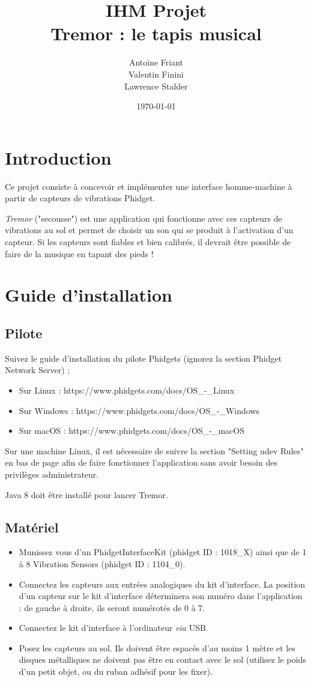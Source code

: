 \documentclass[11pt,a4paper,twoside,svgnames]{article}
\title{\color{DarkGreen}\huge\bfseries IHM Projet\\Tremor : le tapis musical}
\author{Antoine Friant\\Valentin Finini\\Lawrence Stalder}
\date{\today}
\begin{document}
	
	\maketitle
	
	
	\section{Introduction}
	Ce projet consiste à concevoir et implémenter une interface homme-machine à partir de capteurs de vibrations Phidget.
	
	\textit{Tremor} ("secousse") est une application qui fonctionne avec ces capteurs de vibrations au sol et permet de choisir un son qui se produit à l'activation d'un capteur. Si les capteurs sont fiables et bien calibrés, il devrait être possible de faire de la musique en tapant des pieds !
	
	\section{Guide d'installation}
	
	\subsection{Pilote}
	Suivez le guide d'installation du pilote Phidgets (ignorez la section Phidget Network Server) :
	\begin{itemize}
		\item Sur Linux : https://www.phidgets.com/docs/OS\_-\_Linux
		\item Sur Windows : https://www.phidgets.com/docs/OS\_-\_Windows
		\item Sur macOS : https://www.phidgets.com/docs/OS\_-\_macOS
	\end{itemize}

	Sur une machine Linux, il est nécessaire de suivre la section "Setting udev Rules" en bas de page afin de faire fonctionner l'application sans avoir besoin des privilèges administrateur.
	
	Java 8 doit être installé pour lancer Tremor.
	
	\subsection{Matériel}
	\begin{itemize}
		\item Munissez vous d'un PhidgetInterfaceKit (phidget ID : 1018\_X) ainsi que de 1 à 8 Vibration Sensors (phidget ID : 1104\_0).
		\item Connectez les capteurs aux entrées analogiques du kit d'interface. La position d'un capteur sur le kit d'interface déterminera son numéro dans l'application : de gauche à droite, ils seront numérotés de 0 à 7.
		\item Connectez le kit d'interface à l'ordinateur \textit{via} USB.
		\item Posez les capteurs au sol. Ils doivent être espacés d'au moins 1 mètre et les disques métalliques ne doivent pas être en contact avec le sol (utilisez le poids d'un petit objet, ou du ruban adhésif pour les fixer).
	\end{itemize}
\end{document}
